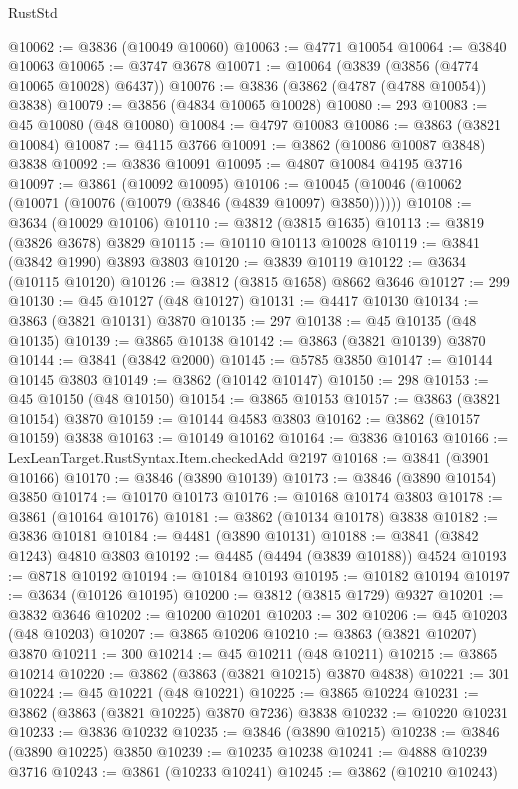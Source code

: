 \begin{lexlean}{RustStd}
\begin{coremodule}
@10062 := @3836 (@10049 @10060)
@10063 := @4771 @10054
@10064 := @3840 @10063
@10065 := @3747 @3678
@10071 := @10064 (@3839 (@3856 (@4774 @10065 @10028) @6437))
@10076 := @3836 (@3862 (@4787 (@4788 @10054)) @3838)
@10079 := @3856 (@4834 @10065 @10028)
@10080 := 293
@10083 := @45 @10080 (@48 @10080)
@10084 := @4797 @10083
@10086 := @3863 (@3821 @10084)
@10087 := @4115 @3766
@10091 := @3862 (@10086 @10087 @3848) @3838
@10092 := @3836 @10091
@10095 := @4807 @10084 @4195 @3716
@10097 := @3861 (@10092 @10095)
@10106 := @10045 (@10046 (@10062 (@10071 (@10076 (@10079 (@3846 (@4839 @10097) @3850))))))
@10108 := @3634 (@10029 @10106)
@10110 := @3812 (@3815 @1635)
@10113 := @3819 (@3826 @3678) @3829
@10115 := @10110 @10113 @10028
@10119 := @3841 (@3842 @1990) @3893 @3803
@10120 := @3839 @10119
@10122 := @3634 (@10115 @10120)
@10126 := @3812 (@3815 @1658) @8662 @3646
@10127 := 299
@10130 := @45 @10127 (@48 @10127)
@10131 := @4417 @10130
@10134 := @3863 (@3821 @10131) @3870
@10135 := 297
@10138 := @45 @10135 (@48 @10135)
@10139 := @3865 @10138
@10142 := @3863 (@3821 @10139) @3870
@10144 := @3841 (@3842 @2000)
@10145 := @5785 @3850
@10147 := @10144 @10145 @3803
@10149 := @3862 (@10142 @10147)
@10150 := 298
@10153 := @45 @10150 (@48 @10150)
@10154 := @3865 @10153
@10157 := @3863 (@3821 @10154) @3870
@10159 := @10144 @4583 @3803
@10162 := @3862 (@10157 @10159) @3838
@10163 := @10149 @10162
@10164 := @3836 @10163
@10166 := LexLeanTarget.RustSyntax.Item.checkedAdd @2197
@10168 := @3841 (@3901 @10166)
@10170 := @3846 (@3890 @10139)
@10173 := @3846 (@3890 @10154) @3850
@10174 := @10170 @10173
@10176 := @10168 @10174 @3803
@10178 := @3861 (@10164 @10176)
@10181 := @3862 (@10134 @10178) @3838
@10182 := @3836 @10181
@10184 := @4481 (@3890 @10131)
@10188 := @3841 (@3842 @1243) @4810 @3803
@10192 := @4485 (@4494 (@3839 @10188)) @4524
@10193 := @8718 @10192
@10194 := @10184 @10193
@10195 := @10182 @10194
@10197 := @3634 (@10126 @10195)
@10200 := @3812 (@3815 @1729) @9327
@10201 := @3832 @3646
@10202 := @10200 @10201
@10203 := 302
@10206 := @45 @10203 (@48 @10203)
@10207 := @3865 @10206
@10210 := @3863 (@3821 @10207) @3870
@10211 := 300
@10214 := @45 @10211 (@48 @10211)
@10215 := @3865 @10214
@10220 := @3862 (@3863 (@3821 @10215) @3870 @4838)
@10221 := 301
@10224 := @45 @10221 (@48 @10221)
@10225 := @3865 @10224
@10231 := @3862 (@3863 (@3821 @10225) @3870 @7236) @3838
@10232 := @10220 @10231
@10233 := @3836 @10232
@10235 := @3846 (@3890 @10215)
@10238 := @3846 (@3890 @10225) @3850
@10239 := @10235 @10238
@10241 := @4888 @10239 @3716
@10243 := @3861 (@10233 @10241)
@10245 := @3862 (@10210 @10243)

\end{coremodule}
\end{lexlean}
